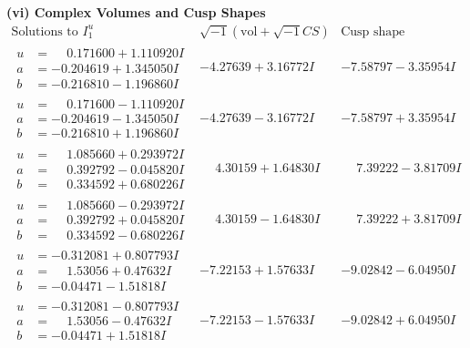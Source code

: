 \documentclass[1p]{elsarticle_modified}
\theoremstyle{definition}
\newcommand{\I}{\sqrt{-1}}
\begin{document}
\newpage\flushleft \textbf{(vi) Complex Volumes and Cusp Shapes}
$$\begin{array}{c|c|c}  
\text{Solutions to }I^u_{1}& \I (\text{vol} + \sqrt{-1}CS) & \text{Cusp shape}\\
 \hline 
\begin{aligned}
u &= \phantom{-}0.171600 + 1.110920 I \\
a &= -0.204619 + 1.345050 I \\
b &= -0.216810 - 1.196860 I\end{aligned}
 & -4.27639 + 3.16772 I & -7.58797 - 3.35954 I \\ \hline\begin{aligned}
u &= \phantom{-}0.171600 - 1.110920 I \\
a &= -0.204619 - 1.345050 I \\
b &= -0.216810 + 1.196860 I\end{aligned}
 & -4.27639 - 3.16772 I & -7.58797 + 3.35954 I \\ \hline\begin{aligned}
u &= \phantom{-}1.085660 + 0.293972 I \\
a &= \phantom{-}0.392792 - 0.045820 I \\
b &= \phantom{-}0.334592 + 0.680226 I\end{aligned}
 & \phantom{-}4.30159 + 1.64830 I & \phantom{-}7.39222 - 3.81709 I \\ \hline\begin{aligned}
u &= \phantom{-}1.085660 - 0.293972 I \\
a &= \phantom{-}0.392792 + 0.045820 I \\
b &= \phantom{-}0.334592 - 0.680226 I\end{aligned}
 & \phantom{-}4.30159 - 1.64830 I & \phantom{-}7.39222 + 3.81709 I \\ \hline\begin{aligned}
u &= -0.312081 + 0.807793 I \\
a &= \phantom{-}1.53056 + 0.47632 I \\
b &= -0.04471 - 1.51818 I\end{aligned}
 & -7.22153 + 1.57633 I & -9.02842 - 6.04950 I \\ \hline\begin{aligned}
u &= -0.312081 - 0.807793 I \\
a &= \phantom{-}1.53056 - 0.47632 I \\
b &= -0.04471 + 1.51818 I\end{aligned}
 & -7.22153 - 1.57633 I & -9.02842 + 6.04950 I \\ \hline\begin{aligned}

\end{aligned}
\end{array}$$
\end{document}
